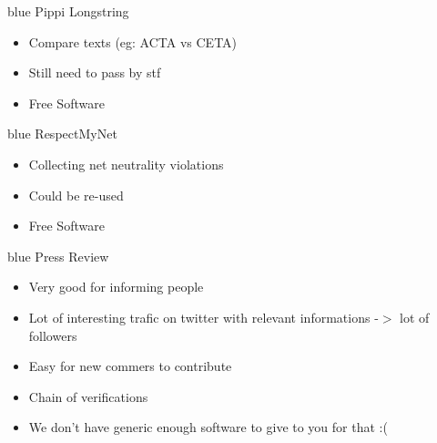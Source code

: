 \documentclass{beamer}
\begin{document}
\begin{frame}[fragile]{}
\begin{LARGE}
\begin{color}{blue}
    Pippi Longstring
\end{color}
\end{LARGE}
\vspace{3mm}
\begin{itemize}
    \item Compare texts (eg: ACTA vs CETA)
    \item Still need to pass by stf
    \item Free Software
\end{itemize}
\end{frame}

\begin{frame}[fragile]{}
\begin{LARGE}
\begin{color}{blue}
    RespectMyNet
\end{color}
\end{LARGE}
\vspace{3mm}
\begin{itemize}
    \item Collecting net neutrality violations
    \item Could be re-used
    \item Free Software
\end{itemize}
\end{frame}

\begin{frame}[fragile]{}
\begin{LARGE}
\begin{color}{blue}
    Press Review
\end{color}
\end{LARGE}
\vspace{3mm}
\begin{itemize}
    \item Very good for informing people
    \item Lot of interesting trafic on twitter with relevant informations -$>$ lot of followers
    \item Easy for new commers to contribute
    \item Chain of verifications
    \item We don't have generic enough software to give to you for that :(
\end{itemize}
\end{frame}
\end{document}
